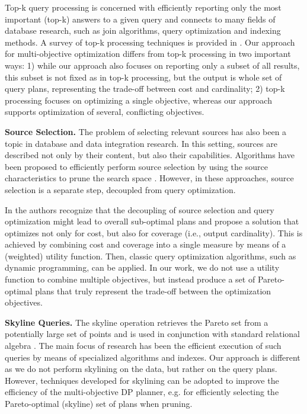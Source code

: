Top-k query processing is concerned with efficiently reporting only
the most important (top-k) answers to a given query and connects to
many fields of database research, such as join algorithms, query
optimization and indexing methods. A survey of top-k processing
techniques is provided in \cite{ilyas_survey_2008}. Our approach for
multi-objective optimization differs from top-k processing in two
important ways: 1) while our approach also focuses on reporting only a
subset of all results, this subset is not fixed as in top-k
processing, but the output is whole set of query plans, representing
the trade-off between cost and cardinality; 2) top-k processing
focuses on optimizing a single objective, whereas our approach
supports optimization of several, conflicting objectives.


\textbf{Source Selection.} The problem of selecting relevant sources
has also been a topic in database and data integration research. In
this setting, sources are described not only by their content, but
also their capabilities. Algorithms have been proposed to efficiently
perform source selection by using the source characteristics to prune
the search space \cite{levy_querying_1996}. However, in these
approaches, source selection is a separate step, decoupled from query
optimization.

In \cite{nie_joint_2001} the authors recognize that the decoupling of
source selection and query optimization might lead to overall
sub-optimal plans and propose a solution that optimizes not only for
cost, but also for coverage (i.e., output cardinality). This is
achieved by combining cost and coverage into a single measure by means
of a (weighted) utility function. Then, classic query optimization
algorithms, such as dynamic programming, can be applied. In our work,
we do not use a utility function to combine multiple objectives, but
instead produce a set of Pareto-optimal plans that truly represent the
trade-off between the optimization objectives.



\textbf{Skyline Queries.} The skyline operation retrieves the Pareto
set from a potentially large set of points and is used in conjunction
with standard relational algebra \cite{boerzsoenyi_skyline_2001}. The
main focus of research has been the efficient execution of such
queries by means of specialized algorithms and indexes. Our approach
is different as we do not perform skylining on the data, but rather on
the query plans. However, techniques developed for skylining can be
adopted to improve the efficiency of the multi-objective DP planner,
e.g. for efficiently selecting the Pareto-optimal (skyline) set of
plans when pruning.


